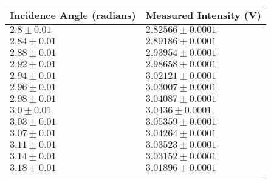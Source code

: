 \begin{tabular}{| p{} | p{} |}
\hline
Incidence Angle (radians) & Measured Intensity (V)\\
\hline
$2.8 \pm 0.01$ & $2.82566 \pm 0.0001$\\
$2.84 \pm 0.01$ & $2.89186 \pm 0.0001$\\
$2.88 \pm 0.01$ & $2.93954 \pm 0.0001$\\
$2.92 \pm 0.01$ & $2.98658 \pm 0.0001$\\
$2.94 \pm 0.01$ & $3.02121 \pm 0.0001$\\
$2.96 \pm 0.01$ & $3.03007 \pm 0.0001$\\
$2.98 \pm 0.01$ & $3.04087 \pm 0.0001$\\
$3.0 \pm 0.01$ & $3.0436 \pm 0.0001$\\
$3.03 \pm 0.01$ & $3.05359 \pm 0.0001$\\
$3.07 \pm 0.01$ & $3.04264 \pm 0.0001$\\
$3.11 \pm 0.01$ & $3.03523 \pm 0.0001$\\
$3.14 \pm 0.01$ & $3.03152 \pm 0.0001$\\
$3.18 \pm 0.01$ & $3.01896 \pm 0.0001$\\
\hline
\end{tabular}